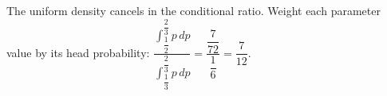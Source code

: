 The uniform density cancels in the conditional ratio. Weight each parameter value by its head probability: $\dfrac{\int_{\dfrac{1}{2}}^{\dfrac{2}{3}}p\,dp}{\int_{\dfrac{1}{3}}^{\dfrac{2}{3}}p\,dp}=\dfrac{\dfrac{7}{72}}{\dfrac{1}{6}}=\boxed{\dfrac{7}{12}}$.
